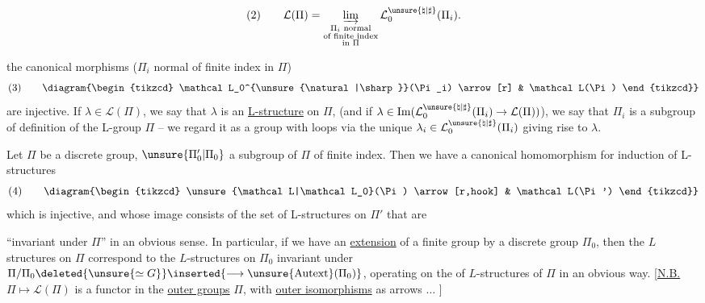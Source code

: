 
\[
\text{(2)}\qquad
\mathcal L(\Pi)=
\varinjlim_{\substack{\Pi_i\text{ normal}\\
\text{of finite index}\\
\text{in }\Pi}}
\mathcal L_0^{\unsure{\natural|\sharp}}(\Pi_i).
\]


the canonical morphisms ($\Pi_i$ normal of finite index
in $\Pi$)
\[
\text{(3)}\qquad
\diagram{\begin{tikzcd}
\mathcal L_0^{\unsure{\natural|\sharp}}(\Pi_i) \arrow[r] & \mathcal L(\Pi)
\end{tikzcd}}
\]
are injective. If $\lambda\in\mathcal L(\Pi)$, we say that
$\lambda$ is an \uline{L-structure} on $\Pi$,
(and if
$\lambda\in\operatorname{Im}(\mathcal L_0^{\unsure{\natural|\sharp}}(\Pi_i)\to\mathcal L(\Pi))$),
we say that $\Pi_i$ is
a subgroup of definition of the L-group
$\Pi$ -- we regard it as a
group with loops via the unique $\lambda_i\in\mathcal L_0^{\unsure{\natural|\sharp}}(\Pi_i)$
giving rise to $\lambda$.

Let $\Pi$ be a discrete group, $\unsure{\Pi'_0|\Pi_0}$ a
subgroup of $\Pi$ of finite index. Then
we have a canonical homomorphism
for induction of L-structures
\[
\text{(4)}\qquad
\diagram{\begin{tikzcd}
\unsure{\mathcal L|\mathcal L_0}(\Pi) \arrow[r,hook] & \mathcal L(\Pi')
\end{tikzcd}}
\]
which is injective, and whose image consists
of the set of L-structures on $\Pi'$ that are

``invariant under $\Pi$'' in an obvious sense.
In particular, if we have an \uline{extension}
of a finite group  by a
discrete group $\Pi_0$, then the $L$ structures on
$\Pi$ correspond to the $L$-structures
on $\Pi_0$ invariant under
$\Pi/\Pi_0\deleted{\unsure{\simeq G}}\inserted{\longrightarrow\unsure{\mathrm{Autext}}(\Pi_0)}$,
operating on the  of $L$-structures of $\Pi$
in an obvious way. [\uline{N.B.} $\Pi\mapsto\mathcal{L}(\Pi)$ is
a functor in the \uline{outer groups}
$\Pi$, with \uline{outer isomorphisms}
as arrows $\ldots$ ]

